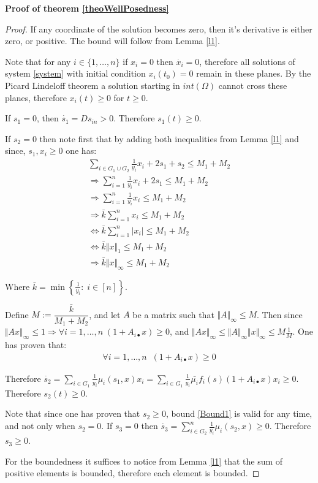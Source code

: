 \documentclass[3p,times]{article}
\begin{document}
\textbf{Proof of theorem \ref{theoWellPosedness}}

\begin{proof}
	If any coordinate of the solution becomes zero, then it's derivative is either zero, or positive. The bound will follow from Lemma \ref{l1}.
	
	Note that for any $i \in \{1,\dots, n\} $ if $x_i = 0$ then $\dot{x_{i}} = 0$, therefore all solutions of system \eqref{system} with initial condition $x_i(t_0) = 0$ remain in these planes. By the Picard Lindeloff theorem a solution starting in $int(\Omega)$ cannot cross these planes, therefore $x_i(t)\geq 0$ for $t \geq 0$.
	
	If $s_1 = 0$, then $\dot{s_1} = Ds_{in} > 0$. Therefore $s_1(t) \geq 0$.
	
	If $s_2 = 0$ then note first that by adding both inequalities from Lemma \eqref{l1} and since, $s_1,x_i \geq 0$ one has:
	\begin{align*}
	\sum \limits_{i \in G_1 \cup G_2}  \frac{1}{y_i} x_i + 2s_1 + s_2 \leq M_1 + M_2 \\
	\Rightarrow \sum \limits_{i = 1}^{n}  \frac{1}{y_i} x_i + 2s_1 \leq M_1 + M_2 \\
	\Rightarrow \sum \limits_{i = 1}^{n}  \frac{1}{y_i} x_i \leq M_1 + M_2\\ 
	\Rightarrow \bar{k} \sum  \limits_{i = 1}^{n}   x_i  \leq M_1 + M_2  \\
	\Leftrightarrow \bar{k} \sum  \limits_{i = 1}^{n}   \vert x_i \vert  \leq M_1 + M_2  \\
	\Leftrightarrow \bar{k} \Vert x \Vert_1  \leq M_1 + M_2  \\
	\Rightarrow   \bar{k} \Vert x \Vert_{\infty} \leq M_1 + M_2
	\end{align*}
	
	Where $\bar{k} = \min \left\{ \frac{1}{y_i}  : \; i\in [n] \right \}$.
	
	Define $M := \dfrac{\bar{k}}{M_1 + M_2}$, and let $A$ be a matrix such that $\Vert A \Vert_{\infty} \leq M$. Then since $\Vert Ax \Vert_{\infty} \leq 1 \Rightarrow \forall i=1,\dots,n \; (1 + A_{i\bullet}x) \geq 0 $, and $\Vert Ax \Vert_{\infty} \leq \Vert A \Vert_{\infty} \Vert x\Vert_{\infty} \leq M \frac{1}{M}$.
	One has proven that:
	\begin{align}
	\label{Bound1} \forall i=1,\dots,n \;  \;  (1 + A_{i\bullet}x) \geq 0 
	\end{align} 
	
	Therefore $\dot{s_2} = \displaystyle \sum \limits_{i \in G_1 } \frac{1}{y_i}\mu_i(s_1,x)x_i =  \sum \limits_{i \in G_1 } \frac{1}{y_i}\bar{\mu_i}f_i(s)(1+A_{i \bullet }x)x_i \geq 0$. Therefore $s_2(t) \geq 0$.
	
	Note that since one has proven that $s_2 \geq 0$, bound \eqref{Bound1} is valid for any time, and not only when $s_2 = 0$. 
	If $s_3 = 0$ then $\dot{s_3} = \sum \limits_{i \in G_2 }^{n}\frac{1}{y_i}\mu_i(s_2,x)\geq 0$. Therefore $s_3 \geq 0$.
	
	For the boundedness it suffices to notice from Lemma \ref{l1} that the sum of positive elements is bounded, therefore each element is bounded.
\end{proof}
\end{document}

